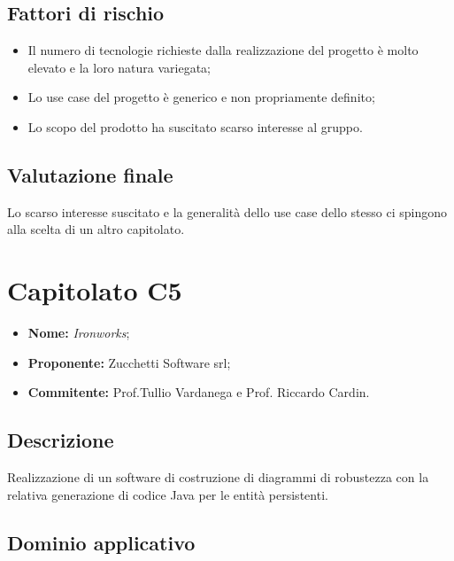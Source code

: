 \documentclass[openany,12pt,a4paper]{report}
\begin{document}
	\subsection{Fattori di rischio}

	\begin{itemize}
		\item Il numero di tecnologie richieste dalla realizzazione del progetto è molto elevato e la loro natura variegata;

		\item Lo use case del progetto è generico e non propriamente definito;

		\item Lo scopo del prodotto ha suscitato scarso interesse al gruppo.
	\end{itemize}

	\subsection{Valutazione finale}

	Lo scarso interesse suscitato e la generalità dello use case dello stesso ci spingono alla scelta di un altro capitolato.


	\section{Capitolato C5}

	\begin{itemize}
		\item \textbf{Nome:} \textit{Ironworks};
		\item \textbf{Proponente:} Zucchetti Software srl;
		\item \textbf{Commitente:} Prof.Tullio Vardanega e Prof. Riccardo Cardin.
	\end{itemize}

	\subsection{Descrizione}

	Realizzazione di un software di costruzione di diagrammi di robustezza con la relativa generazione di codice Java per le entità persistenti.

	\subsection{Dominio applicativo}
\end{document}
